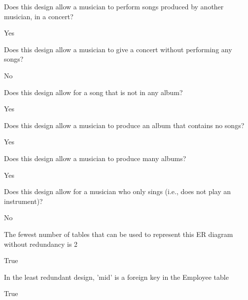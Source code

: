 \documentclass[12pt, letterpaper]{article}
\begin{document}
\begin{subproblem}{}
    Does this design allow a musician to perform songs produced by another musician, in a
concert?
\end{subproblem}
\begin{solution}
    Yes
\end{solution}

\begin{subproblem}{}
    Does this design allow a musician to give a concert without performing any songs?
\end{subproblem}
\begin{solution}
    No
\end{solution}

\begin{subproblem}{}
    Does this design allow for a song that is not in any album?
\end{subproblem}
\begin{solution}
    Yes
\end{solution}

\begin{subproblem}{}
    Does this design allow a musician to produce an album that contains no songs?
\end{subproblem}
\begin{solution}
    Yes
\end{solution}

\begin{subproblem}{}
    Does this design allow a musician to produce many albums?
\end{subproblem}
\begin{solution}
    Yes
\end{solution}

\begin{subproblem}{}
    Does this design allow for a musician who only sings (i.e., does not play an instrument)?
\end{subproblem}
\begin{solution}
    No
\end{solution}

\qh
\begin{subproblem}{}
    The fewest number of tables that can be used to represent this ER diagram without
redundancy is 2
\end{subproblem}
\begin{solution}
    True
\end{solution}

\begin{subproblem}{}
    In the least redundant design, 'mid' is a foreign key in the Employee table
\end{subproblem}
\begin{solution}
    True
\end{solution}
\end{document}
